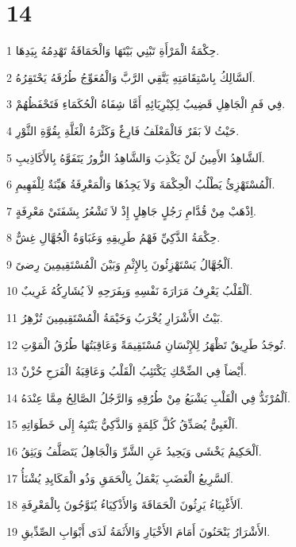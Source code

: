 \chapter{14}

\par 1 حِكْمَةُ الْمَرْأَةِ تَبْنِي بَيْتَهَا وَالْحَمَاقَةُ تَهْدِمُهُ بِيَدِهَا.
\par 2 اَلسَّالِكُ بِاسْتِقَامَتِهِ يَتَّقِي الرَّبَّ وَالْمُعَوِّجُ طُرُقَهُ يَحْتَقِرُهُ.
\par 3 فِي فَمِ الْجَاهِلِ قَضِيبٌ لِكِبْرِيَائِهِ أَمَّا شِفَاهُ الْحُكَمَاءِ فَتَحْفَظُهُمْ.
\par 4 حَيْثُ لاَ بَقَرٌ فَالْمَعْلَفُ فَارِغٌ وَكَثْرَةُ الْغَلَّةِ بِقُوَّةِ الثَّوْرِ.
\par 5 اَلشَّاهِدُ الأَمِينُ لَنْ يَكْذِبَ وَالشَّاهِدُ الزُّورُ يَتَفَوَّهُ بِالأَكَاذِيبِ.
\par 6 اَلْمُسْتَهْزِئُ يَطْلُبُ الْحِكْمَةَ وَلاَ يَجِدُهَا وَالْمَعْرِفَةُ هَيِّنَةٌ لِلْفَهِيمِ.
\par 7 اِذْهَبْ مِنْ قُدَّامِ رَجُلٍ جَاهِلٍ إِذْ لاَ تَشْعُرُ بِشَفَتَيْ مَعْرِفَةٍ.
\par 8 حِكْمَةُ الذَّكِيِّ فَهْمُ طَرِيقِهِ وَغَبَاوَةُ الْجُهَّالِ غِشٌّ.
\par 9 اَلْجُهَّالُ يَسْتَهْزِئُونَ بِالإِثْمِ وَبَيْنَ الْمُسْتَقِيمِينَ رِضىً.
\par 10 اَلْقَلْبُ يَعْرِفُ مَرَارَةَ نَفْسِهِ وَبِفَرَحِهِ لاَ يُشَارِكُهُ غَرِيبٌ.
\par 11 بَيْتُ الأَشْرَارِ يُخْرَبُ وَخَيْمَةُ الْمُسْتَقِيمِينَ تُزْهِرُ.
\par 12 تُوجَدُ طَرِيقٌ تَظْهَرُ لِلإِنْسَانِ مُسْتَقِيمَةً وَعَاقِبَتُهَا طُرُقُ الْمَوْتِ.
\par 13 أَيْضاً فِي الضِّحْكِ يَكْتَئِبُ الْقَلْبُ وَعَاقِبَةُ الْفَرَحِ حُزْنٌ.
\par 14 اَلْمُرْتَدُّ فِي الْقَلْبِ يَشْبَعُ مِنْ طُرُقِهِ وَالرَّجُلُ الصَّالِحُ مِمَّا عِنْدَهُ.
\par 15 اَلْغَبِيُّ يُصَدِّقُ كُلَّ كَلِمَةٍ وَالذَّكِيُّ يَنْتَبِهُ إِلَى خَطَوَاتِهِ.
\par 16 اَلْحَكِيمُ يَخْشَى وَيَحِيدُ عَنِ الشَّرِّ وَالْجَاهِلُ يَتَصَلَّفُ وَيَثِقُ.
\par 17 اَلسَّرِيعُ الْغَضَبِ يَعْمَلُ بِالْحَمَقِ وَذُو الْمَكَايِدِ يُشْنَأُ.
\par 18 اَلأَغْبِيَاءُ يَرِثُونَ الْحَمَاقَةَ وَالأَذْكِيَاءُ يُتَوَّجُونَ بِالْمَعْرِفَةِ.
\par 19 الأَشْرَارُ يَنْحَنُونَ أَمَامَ الأَخْيَارِ وَالأَثَمَةُ لَدَى أَبْوَابِ الصِّدِّيقِ.
